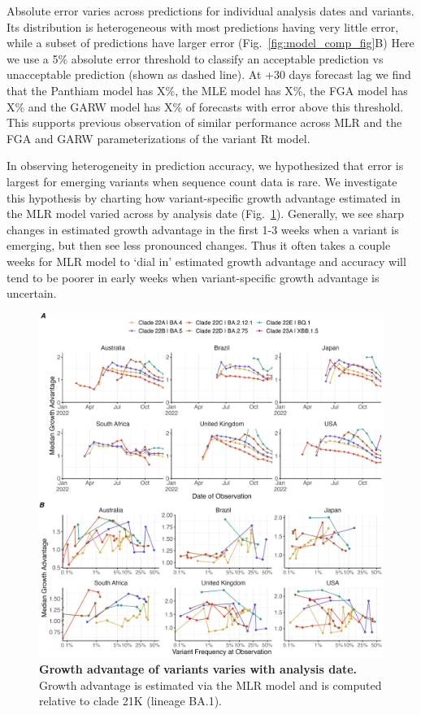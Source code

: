\documentclass[11pt,oneside,letterpaper]{article}
\begin{document}
Absolute error varies across predictions for individual analysis dates and variants.
Its distribution is heterogeneous with most predictions having very little error, while a subset of predictions have larger error (Fig.~\ref{fig:model_comp_fig}B)
Here we use a 5\% absolute error threshold to classify an acceptable prediction vs unacceptable prediction (shown as dashed line).
At +30 days forecast lag we find that the Panthiam model has X\%, the MLE model has X\%, the FGA model has X\% and the GARW model has X\% of forecasts with error above this threshold.
This supports previous observation of similar performance across MLR and the FGA and GARW parameterizations of the variant Rt model.

In observing heterogeneity in prediction accuracy, we hypothesized that error is largest for emerging variants when sequence count data is rare.
We investigate this hypothesis by charting how variant-specific growth advantage estimated in the MLR model varied across by analysis date (Fig.~\ref{fig:ga_estimates}).
Generally, we see sharp changes in estimated growth advantage in the first 1-3 weeks when a variant is emerging, but then see less pronounced changes.
Thus it often takes a couple weeks for MLR model to `dial in' estimated growth advantage and accuracy will tend to be poorer in early weeks when variant-specific growth advantage is uncertain.

\begin{figure}[tb!]
	\centering
    \includegraphics[width=1.0\textwidth]{figures/ga_estimates.png}
	\caption{
		\textbf{Growth advantage of variants varies with analysis date.}
		Growth advantage is estimated via the MLR model and is computed relative to clade 21K (lineage BA.1).
	}
	\label{fig:ga_estimates}
\end{figure}
\end{document}
